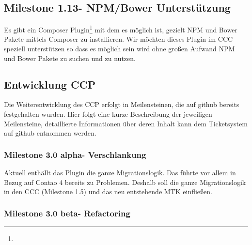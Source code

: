 \documentclass[
paper=a4,
draft=false,%
fontsize=10pt%
]{scrartcl}
\begin{document}
\subsection[Milestone 1.13 - NPM/Bower Unterstützung]{Milestone 1.13\footnotemark - NPM/Bower Unterstützung}
\label{subsec:ccc-milestone-1.13}

Es gibt ein Composer Plugin\footnote{} mit dem es möglich ist, gezielt NPM und Bower Pakete mittels Composer zu installieren. Wir möchten dieses Plugin im CCC speziell unterstützen so dass es möglich sein wird ohne großen Aufwand NPM und Bower Pakete zu suchen und zu nutzen.

\subsection{Entwicklung CCP}
\label{subsec:ccp}

Die Weiterentwicklung des CCP erfolgt in Meilensteinen, die auf github bereits festgehalten wurden. Hier folgt eine kurze Beschreibung der jeweiligen Meilensteine, detaillierte Informationen über deren Inhalt kann dem Ticketsystem auf github entnommen werden.

\subsubsection[Milestone 3.0 alpha - Verschlankung]{Milestone 3.0 alpha\footnotemark - Verschlankung}
\label{subsec:ccp-milestone-3.0-alpha}

Aktuell enthällt das Plugin die ganze Migrationslogik. Das führte vor allem in Bezug auf Contao 4 bereits zu Problemen. Deshalb soll die ganze Migrationslogik in den CCC (Milestone 1.5) und das neu entstehende MTK einfließen.

\subsubsection[Milestone 3.0 beta - Refactoring]{Milestone 3.0 beta\footnotemark - Refactoring}
\label{subsec:ccp-milestone-3.0-beta}
\end{document}
